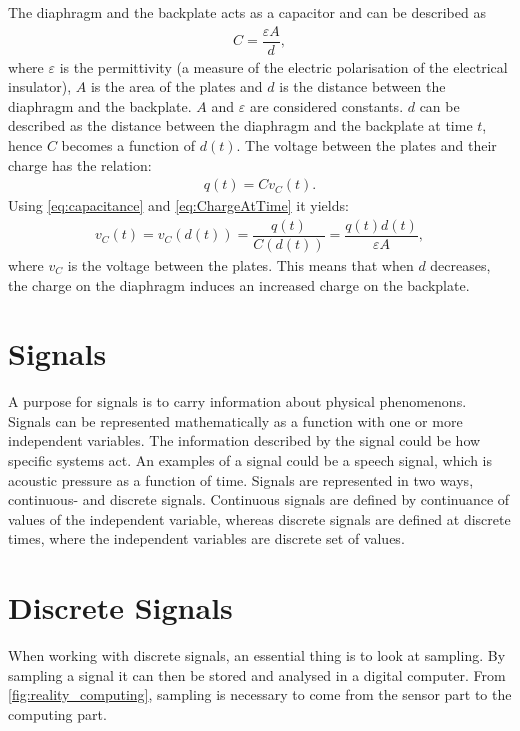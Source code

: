 \noindent The diaphragm and the backplate acts as a capacitor and can be described as
\begin{align}
    C = \dfrac{\varepsilon A}{d}, \label{eq:capacitance}
\end{align}
where $\varepsilon$ is the permittivity (a measure of the electric polarisation of the electrical insulator), $A$ is the area of the plates and $d$ is the distance between the diaphragm and the backplate. $A$ and $\varepsilon$ are considered constants. $d$ can be described as the distance between the diaphragm and the backplate at time $t$, hence $C$ becomes a function of $d(t)$. The voltage between the plates and their charge has the relation:
\begin{align}
q(t)=C v_C(t).
\label{eq:ChargeAtTime}
\end{align}
Using \eqref{eq:capacitance} and \eqref{eq:ChargeAtTime} it yields:
\begin{align*}
    v_C(t)=v_C(d(t))= \dfrac{q(t)}{C(d(t))} = \dfrac{q(t)d(t)}{\varepsilon A},
\end{align*}
where $v_C$ is the voltage between the plates. This means that when $d$ decreases, the charge on the diaphragm induces an increased charge on the backplate. 
\cite[p. 160-161]{LectureNotes}

\section{Signals}
A purpose for signals is to carry information about physical phenomenons. Signals can be represented mathematically as a function with one or more independent variables. The information described by the signal could be how specific systems act. An examples of a signal could be a speech signal, which is acoustic pressure as a function of time. Signals are represented in two ways, continuous- and discrete signals. Continuous signals are defined by continuance of values of the independent variable, whereas discrete signals are defined at discrete times, where the independent variables are discrete set of values. \cite[p. 1-4]{signalSystems} 


\section{Discrete Signals} \label{sec:discrete_signal}

When working with discrete signals, an essential thing is to look at sampling. By sampling a signal it can then be stored and analysed in a digital computer. From  \autoref{fig:reality_computing}, sampling is necessary to come from the sensor part to the computing part.

